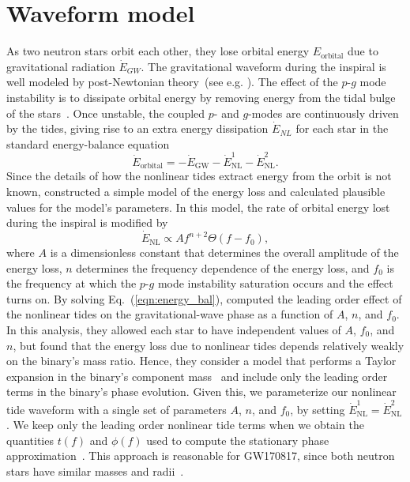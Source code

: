 \section{Waveform model}
\label{sec:waveform}

As two neutron stars orbit each other, they lose orbital energy $E_\mathrm{orbital}$ due to gravitational radiation $\dot{E}_{GW}$. The gravitational waveform during the inspiral is well modeled by post-Newtonian theory~(see e.g. \cite{Blanchet:2013haa}).  The effect of the $p$-$g$ mode instability is to dissipate orbital energy by removing energy from the tidal bulge of the stars~\citep{Weinberg:2013pbi,Weinberg:2015pxa,Essick:2016tkn}. Once unstable, the coupled $p$- and $g$-modes are continuously driven by the tides, giving rise to an extra energy dissipation $\dot{E}_{NL}$ for each star in the standard energy-balance equation~\citep{Peters:1963ux} 
\begin{equation}
\dot{E}_\mathrm{orbital} = -\dot{E}_\mathrm{GW} - \dot{E}^1_\mathrm{NL} - \dot{E}^2_\mathrm{NL}.
\label{eqn:energy_bal}
\end{equation}
Since the details of how the nonlinear tides extract energy from the orbit is not known, \cite{Essick:2016tkn} constructed a simple model of the energy loss and calculated plausible values for the model's parameters. In this model, the rate of orbital energy lost during the inspiral is modified by 
\begin{equation}\label{eqn:energy_nl}
\dot{E}_\mathrm{NL} \propto A f^{n+2} \Theta (f - f_0),
\end{equation}
where $A$ is a dimensionless constant that determines the overall amplitude of the energy loss, $n$ determines the frequency dependence of the energy loss, and $f_0$ is the frequency at which the $p$-$g$ mode instability saturation occurs and the effect turns on. By solving Eq.~(\ref{eqn:energy_bal}), \cite{Essick:2016tkn} computed the leading order effect of the nonlinear tides on the gravitational-wave phase as a function of $A$, $n$, and $f_0$. In this analysis, they allowed each star to have independent values of $A$, $f_0$, and $n$, but found that the energy loss due to nonlinear tides depends relatively weakly on the binary's mass ratio. Hence, they consider a model that performs a Taylor expansion in the binary's component mass~\citep{DelPozzo:2013ala} and include only the leading order terms in the binary's phase evolution. Given this, we parameterize our nonlinear tide waveform with a single set of parameters $A$, $n$, and $f_0$, by setting $\dot{E}^1_\mathrm{NL} = \dot{E}^2_\mathrm{NL}$. We  keep only the leading order nonlinear tide terms when we obtain the quantities $t(f)$ and $\phi(f)$ used to compute the stationary phase approximation~\citep{Sathyaprakash:1991mt,Droz:1999qx,Lindblom:2008cm}. This approach is reasonable for GW170817, since both neutron stars have similar masses and radii~\citep{de2018tidal}.

